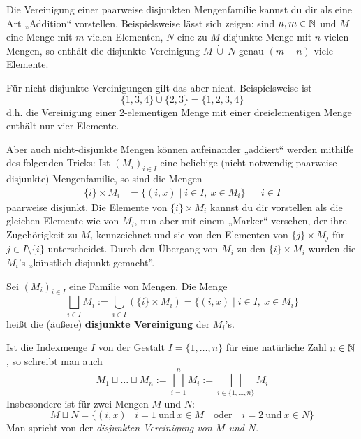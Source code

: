 \begin{bem}
    Die Vereinigung einer paarweise disjunkten Mengenfamilie kannst du dir als eine Art „Addition“ vorstellen. Beispielsweise lässt sich zeigen: sind $n,m\in \mathbb N$ und $M$ eine Menge mit $m$-vielen Elementen, $N$ eine zu $M$ disjunkte Menge mit $n$-vielen Mengen, so enthält die disjunkte Vereinigung $M\ \dot\cup\ N$ genau $(m+n)$-viele Elemente.

    Für nicht-disjunkte Vereinigungen gilt das aber nicht. Beispielsweise ist
        \[\{1,3,4\} \cup \{2,3\}= \{1,2,3,4\} \]
    d.h. die Vereinigung einer 2-elementigen Menge mit einer dreielementigen Menge enthält nur vier Elemente.

    Aber auch nicht-disjunkte Mengen können aufeinander „addiert“ werden mithilfe des folgenden Tricks: Ist $(M_i)_{i\in I}$ eine beliebige (nicht notwendig paarweise disjunkte) Mengenfamilie, so sind die Mengen
    \begin{align*}
        \{i\}\times M_i &= \{(i,x) \mid i\in I,\ x\in M_i\} && i\in I
    \end{align*}
    paarweise disjunkt. Die Elemente von $\{i\}\times M_i$ kannst du dir vorstellen als die gleichen Elemente wie von $M_i$, nun aber mit einem „Marker“ versehen, der ihre Zugehörigkeit zu $M_i$ kennzeichnet und sie von den Elementen von $\{j\}\times M_j$ für $j\in I\setminus \{i\}$ unterscheidet. Durch den Übergang von $M_i$ zu den $\{i\}\times M_i$ wurden die $M_i$'s „künstlich disjunkt gemacht”. 
\end{bem}


\begin{de} \label{def:disjunktcup} 
    Sei $(M_i)_{i\in I}$ eine Familie von Mengen. Die Menge
        \[ \bigsqcup_{i\in I} M_i := \bigcup_{i\in I} (\{i\}\times M_i) = \{(i,x) \mid i\in I,\ x\in M_i \}\]
    heißt die (äußere) \textbf{disjunkte Vereinigung} der $M_i$'s.
    
    Ist die Indexmenge $I$ von der Gestalt $I=\{1,\dots , n\}$ für eine natürliche Zahl $n\in \mathbb N$, so schreibt man auch
        \[ M_1\sqcup\ldots\sqcup M_n := \bigsqcup_{i=1}^n M_i := \bigsqcup_{i\in \{1,\dots , n\}} M_i \]
    Insbesondere ist für zwei Mengen $M$ und $N$:
        \[ M\sqcup N = \{ (i,x)\mid i=1\ \text{und}\ x\in M\quad\text{oder}\quad i=2\ \text{und}\ x\in N\} \]
    Man spricht von der \emph{disjunkten Vereinigung von $M$ und $N$}.
\end{de}


